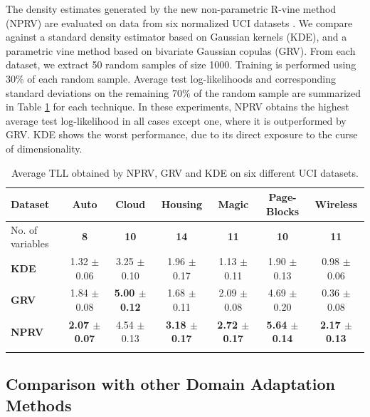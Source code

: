\documentclass{article}
\begin{document}
The density estimates generated by the new non-parametric R-vine method (NPRV)
are evaluated on data from six normalized UCI datasets \cite{uci}.  We compare
against a standard density estimator based on Gaussian kernels (\textsc{KDE}), 
and a parametric vine method based on bivariate Gaussian copulas
(\textsc{GRV}).  From each dataset, we extract 50 random samples of size 1000.
Training is performed using 30\% of each random sample.  Average test
log-likelihoods and corresponding standard deviations on the remaining 70\% of
the random sample are summarized in Table \ref{table:vine_exps} for each
technique.  In these experiments, \textsc{NPRV} obtains the highest average
test log-likelihood in all cases except one, where it is outperformed by
\textsc{GRV}. \textsc{KDE} shows the worst performance, due to its
direct exposure to the curse of dimensionality.

\begin{table}
\begin{center}
\caption{Average TLL obtained by \textsc{NPRV}, \textsc{GRV} and \textsc{KDE} on six different UCI datasets.}
\resizebox{\linewidth}{!}
{
\begin{tabular}{lcccccc}
\hline
Dataset & \textbf{Auto} & \textbf{Cloud} & \textbf{Housing} & \textbf{Magic} & \textbf{Page-Blocks} & \textbf{Wireless}\\
\hline
No. of variables & \textbf{8} & \textbf{10} & \textbf{14} & \textbf{11} & \textbf{10} & \textbf{11}\\ \hline
\textbf{KDE} & 1.32 $\pm$ 0.06 & 3.25 $\pm$ 0.10& 1.96 $\pm$ 0.17 & 1.13 $\pm$ 0.11& 1.90 $\pm$ 0.13& 0.98 $\pm$ 0.06\\ 
\textbf{GRV}  & 1.84 $\pm$ 0.08 & \bf{5.00} $\pm$ \bf{0.12} & 1.68 $\pm$ 0.11 & 2.09 $\pm$ 0.08& 4.69 $\pm$ 0.20& 0.36 $\pm$ 0.08\\ 
\textbf{NPRV} & \bf{2.07} $\pm$ \bf{0.07} & 4.54 $\pm$ 0.13& \bf{3.18} $\pm$ \bf{0.17} & \bf{2.72} $\pm$ \bf{0.17} & \bf{5.64} $\pm$ 0.14& \bf{2.17} $\pm$ 0.13\\ 
\hline
\label{table:vine_exps}
\end{tabular}
}
\end{center}
\end{table}

\subsection{Comparison with other Domain Adaptation Methods}
\end{document}
